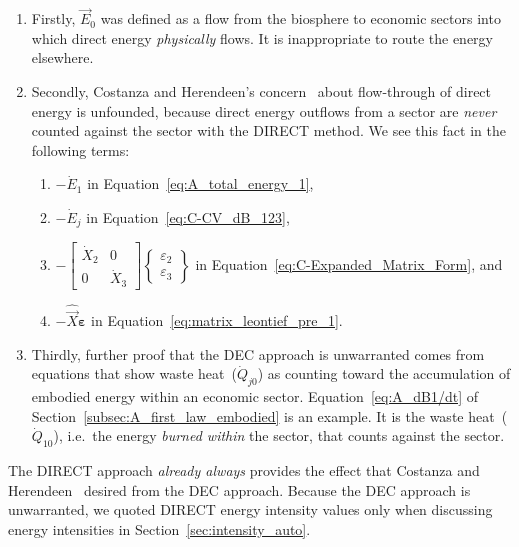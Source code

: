 \begin{enumerate}
	\item 
		Firstly, $\vec{E}_{0}$ was defined as a flow 
		from the biosphere to economic sectors
		into which direct energy \emph{physically} flows.
		It is inappropriate to route the energy elsewhere.
	\item 
		Secondly, Costanza and Herendeen's 
		concern~\cite[pp. 130 \& 138]{Costanza:1984tq}
		about flow-through of direct energy is unfounded, 
		because direct energy outflows from a sector
		are \emph{never} counted against the sector
		with the DIRECT method.
		We see this fact in the following terms:
			\begin{enumerate}
				\item
					{$- \dot{E}_{1}$ in 
					Equation~\ref{eq:A_total_energy_1},}
				\item
					{$- \dot{E}_{j}$ in Equation~\ref{eq:C-CV_dB_123},}
				\item
					{$- 
						\begin{bmatrix}
							\dot{X}_{2} & 0          \\
							0           & \dot{X}_{3}
						\end{bmatrix}
						\begin{Bmatrix}
							\varepsilon_{2}\\
							\varepsilon_{3}
						\end{Bmatrix}
					$
					in Equation~\ref{eq:C-Expanded_Matrix_Form}, and}
				\item
					{$- \hat{\vec{X}}\boldsymbol{\varepsilon}$ 
					in Equation~\ref{eq:matrix_leontief_pre_1}.}
			\end{enumerate}
	\item
		Thirdly, further proof that the DEC approach is unwarranted
		comes from equations that show waste 
		heat~($\dot{Q}_{j0}$) as counting toward 
		the accumulation of embodied energy within 
		an economic sector.
		Equation~\ref{eq:A_dB1/dt} of 
		Section~\ref{subsec:A_first_law_embodied}
		is an example. 
		It is the waste heat~($\dot{Q}_{10}$), 
		i.e.\ the energy \emph{burned within} the sector,
		that counts against the sector.
\end{enumerate}
The DIRECT approach \emph{already always} provides 
the effect that Costanza and Herendeen~\cite{Costanza:1984tq}
desired from the DEC approach. 
Because the DEC approach is unwarranted, 
we quoted DIRECT energy intensity values only
when discussing energy intensities in 
Section~\ref{sec:intensity_auto}.


